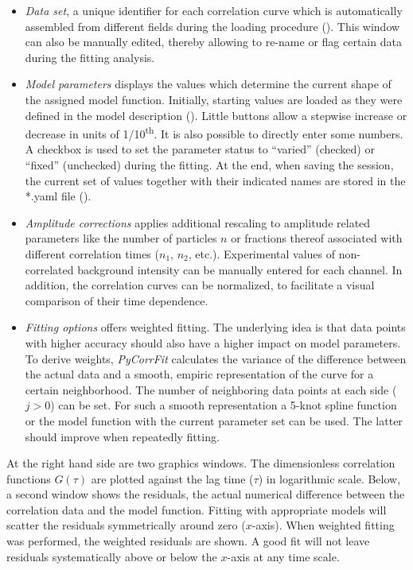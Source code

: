 \begin{itemize}
\item \textit{Data set}, a unique identifier for each correlation curve which is automatically assembled from different fields during the loading procedure (). This window can also be manually edited, thereby allowing to re-name or flag certain data during the fitting analysis. 
\item \textit{Model parameters} displays the values which determine the current shape of the assigned model function. Initially, starting values are loaded as they were defined in the model description (). Little buttons allow a stepwise increase or decrease in units of 1/10\textsuperscript{th}. It is also possible to directly enter some numbers. A checkbox is used to set the parameter status to ``varied'' (checked) or ``fixed'' (unchecked) during the fitting. At the end, when saving the session, the current set of values together with their indicated names are stored in the *.yaml file (). 
\item \textit{Amplitude corrections} applies additional rescaling to amplitude related parameters like the number of particles $n$ or fractions thereof associated with different correlation times ($n_1$, $n_2$, etc.). Experimental values of non-correlated background intensity can be manually entered for each channel. In addition, the correlation curves can be normalized, to facilitate a visual comparison of their time dependence.
\item \textit{Fitting options} offers weighted fitting. The underlying idea is that data points with higher accuracy should also have a higher impact on model parameters. To derive weights, \textit{PyCorrFit} calculates the variance of the difference between the actual data and a smooth, empiric representation of the curve for a certain neighborhood. The number of neighboring data points at each side ($j > 0$) can be set. For such a smooth representation a 5-knot spline function or the model function with the current parameter set can be used. The latter should improve when repeatedly fitting.
\end{itemize}
At the right hand side are two graphics windows. The dimensionless correlation functions $G(\tau)$ are plotted against the lag time ($\tau$) in logarithmic scale. Below, a second window shows the residuals, the actual numerical difference between the correlation data and the model function. Fitting with appropriate models will scatter the residuals symmetrically around zero ($x$-axis). When weighted fitting was performed, the weighted residuals are shown. A good fit will not leave residuals systematically above or below the $x$-axis at any time scale.

